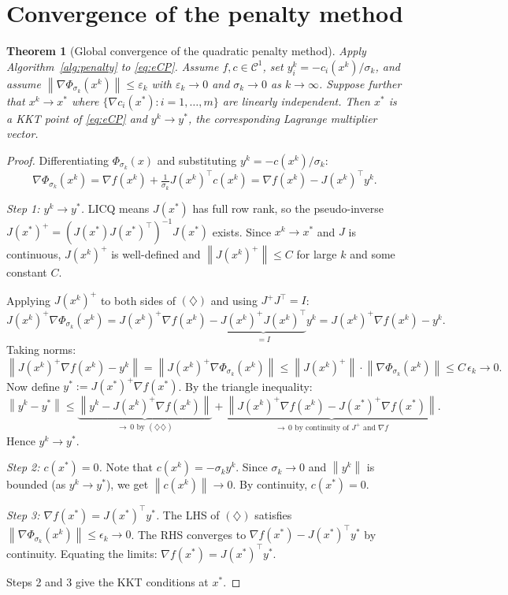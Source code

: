 \documentclass[11pt,a4paper]{report}
\theoremstyle{plain}
\newtheorem{theorem}{Theorem}[chapter]
\theoremstyle{definition}
\newcommand{\norm}[1]{\left\lVert#1\right\rVert}
\newcommand{\grad}{\nabla}
\newcommand{\trans}{^{\top}}
\newcommand{\eps}{\varepsilon}
\begin{document}
\section{Convergence of the penalty method}

\begin{theorem}[Global convergence of the quadratic penalty method]\label{thm:penalty}
Apply Algorithm~\ref{alg:penalty} to \eqref{eq:eCP}. Assume $f,c\in\mathcal{C}^{1}$, set
$y^{k}_{i}=-c_{i}(x^{k})/\sigma_{k}$, and assume
$\norm{\grad\Phi_{\sigma_{k}}(x^{k})}\le\eps_{k}$ with $\eps_{k}\to 0$ and
$\sigma_{k}\to 0$ as $k\to\infty$. Suppose further that $x^{k}\to x^{*}$ where
$\{\grad c_{i}(x^{*}):i=1,\dots,m\}$ are linearly independent. Then $x^{*}$ is a
KKT point of \eqref{eq:eCP} and $y^{k}\to y^{*}$, the corresponding Lagrange
multiplier vector.
\end{theorem}

\begin{proof}
  Differentiating $\Phi_{\sigma_k}(x)$ and substituting $y^k = -c(x^k)/\sigma_k$:
  \[
  \grad\Phi_{\sigma_k}(x^k) 
  = \grad f(x^k) + \tfrac{1}{\sigma_k}J(x^k)\trans c(x^k) 
  = \grad f(x^k) - J(x^k)\trans y^k. \tag{$\diamondsuit$}
  \]
  
  \textit{Step 1: $y^k \to y^*$.}
  LICQ means $J(x^*)$ has full row rank, so the pseudo-inverse $J(x^*)^+ = (J(x^*)J(x^*)\trans)^{-1}J(x^*)$ exists. Since $x^k \to x^*$ and $J$ is continuous, $J(x^k)^+$ is well-defined and $\norm{J(x^k)^+} \leq C$ for large $k$ and some constant $C$.
   
  Applying $J(x^k)^+$ to both sides of $(\diamondsuit)$ and using $J^+J\trans = I$:
  \[
  J(x^k)^+\grad\Phi_{\sigma_k}(x^k) 
  = J(x^k)^+\grad f(x^k) - \underbrace{J(x^k)^+J(x^k)\trans}_{= I} y^k 
  = J(x^k)^+\grad f(x^k) - y^k.
  \]
  Taking norms:
  \[
  \norm{J(x^k)^+\grad f(x^k) - y^k} = \norm{J(x^k)^+\grad\Phi_{\sigma_k}(x^k)} \leq \norm{J(x^k)^+}\cdot\norm{\grad\Phi_{\sigma_k}(x^k)} \leq C\,\epsilon_k \to 0. \tag{$\diamondsuit\diamondsuit$}
  \]
  Now define $y^* := J(x^*)^+\grad f(x^*)$. By the triangle inequality:
  \[
  \norm{y^k - y^*} 
  \leq \underbrace{\norm{y^k - J(x^k)^+\grad f(x^k)}}_{\to\,0\text{ by }(\diamondsuit\diamondsuit)} 
  + \underbrace{\norm{J(x^k)^+\grad f(x^k) - J(x^*)^+\grad f(x^*)}}_{\to\,0\text{ by continuity of }J^+\text{ and }\grad f}.
  \]
  Hence $y^k \to y^*$.
   
  \textit{Step 2: $c(x^*) = 0$.}
  Note that $c(x^k) = -\sigma_k y^k$. Since $\sigma_k \to 0$ and $\norm{y^k}$ is bounded (as $y^k \to y^*$), we get $\norm{c(x^k)} \to 0$. By continuity, $c(x^*) = 0$.
   
  \textit{Step 3: $\grad f(x^*) = J(x^*)\trans y^*$.}
  The LHS of $(\diamondsuit)$ satisfies $\norm{\grad\Phi_{\sigma_k}(x^k)} \leq \epsilon_k \to 0$. The RHS converges to $\grad f(x^*) - J(x^*)\trans y^*$ by continuity. Equating the limits: $\grad f(x^*) = J(x^*)\trans y^*$.
   
  \medskip
  Steps 2 and 3 give the KKT conditions at $x^*$.
\end{proof}
\end{document}
